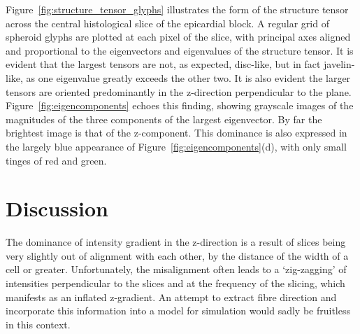   Figure~\ref{fig:structure_tensor_glyphs} illustrates the form of the structure tensor across the central histological slice of the epicardial block. A regular grid of spheroid glyphs are plotted at each pixel of the slice, with principal axes aligned and proportional to the eigenvectors and eigenvalues of the structure tensor. It is evident that the largest tensors are not, as expected, disc-like, but in fact javelin-like, as one eigenvalue greatly exceeds the other two. It is also evident the larger tensors are oriented predominantly in the z-direction perpendicular to the plane. Figure~\ref{fig:eigencomponents} echoes this finding, showing grayscale images of the magnitudes of the three components of the largest eigenvector. By far the brightest image is that of the z-component. This dominance is also expressed in the largely blue appearance of Figure~\ref{fig:eigencomponents}(d), with only small tinges of red and green.

\section{Discussion} %
  The dominance of intensity gradient in the z-direction is a result of slices being very slightly out of alignment with each other, by the distance of the width of a cell or greater. Unfortunately, the misalignment often leads to a `zig-zagging' of intensities perpendicular to the slices and at the frequency of the slicing, which manifests as an inflated z-gradient. An attempt to extract fibre direction and incorporate this information into a model for simulation would sadly be fruitless in this context.
  
\label{sec:discussion}
  
